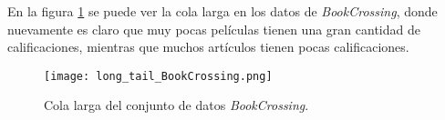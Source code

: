 En la figura \ref{fig:BC_long_tail} se puede ver la cola larga en los datos de \textit{BookCrossing}, donde nuevamente es claro que muy pocas películas tienen una gran cantidad de calificaciones, mientras que muchos artículos tienen pocas calificaciones.

\begin{figure}
	\centering
 	\texttt{[image: long\_tail\_BookCrossing.png]}
 	\caption{Cola larga del conjunto de datos \textit{BookCrossing}.}
 	\label{fig:BC_long_tail}
\end{figure}